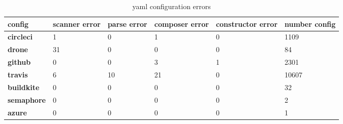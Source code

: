\begin {table}[!htbp]

\caption{yaml configuration errors}
\label{table_yaml_errors}
\begin{tabular}{|l|l|l|l|l|l|}
\hline
\textbf{config}     &    scanner error &   parse error &  composer error &   constructor error & number config \\ \hline

\textbf{circleci }  &                1 &             0 &              1 &                    0 &       1109 \\ \hline
\textbf{drone    }  &               31 &             0 &              0 &                    0 &         84 \\ \hline
\textbf{github   }  &                0 &             0 &              3 &                    1 &       2301 \\ \hline
\textbf{travis   }  &                6 &            10 &             21 &                    0 &      10607 \\ \hline
\textbf{buildkite} &                 0 &            0 &              0  &                   0 &          32 \\ \hline
\textbf{semaphore}  &                0 &             0 &              0 &                    0 &          2 \\ \hline
\textbf{azure    }  &                0 &             0 &              0 &                    0 &          1 \\ \hline

\end{tabular}
\end{table}
